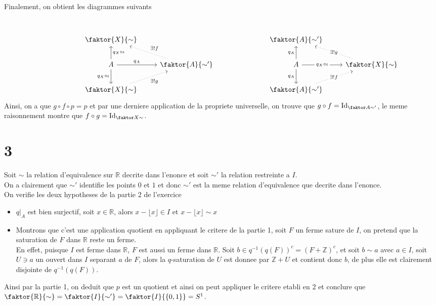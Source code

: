 \documentclass[11pt, a4paper]{article}
\DeclareMathOperator{\id}{Id}
\begin{document}
Finalement, on obtient les diagrammes suivants
\[\begin{tikzcd}
	{} \\
	&& {\faktor {X} {\sim}} &&&& {\faktor {A} {\sim'}} \\
	&& A & { \faktor {A} {\sim'}} &&& A & {\faktor {X} {\sim}} \\
	&& {\faktor {X} {\sim}} &&&& {\faktor {A} {\sim'}}
	\arrow["{q_X\circ\iota}"', from=3-3, to=4-3]
	\arrow["{q_A}", from=3-3, to=3-4]
	\arrow["{\exists ! g}"', dotted, from=4-3, to=3-4]
	\arrow["{q_X\circ\iota}"', from=3-3, to=2-3]
	\arrow["{\exists ! f}"', dotted, from=3-4, to=2-3]
	\arrow["{q_A}"', from=3-7, to=4-7]
	\arrow["{q_A}", from=3-7, to=2-7]
	\arrow["{q_X\circ \iota}"{description}, from=3-7, to=3-8]
	\arrow["{\exists ! f}"{description}, dotted, from=4-7, to=3-8]
	\arrow["{\exists ! g}"{description}, dotted, from=3-8, to=2-7]
\end{tikzcd}\]
Ainsi, on a que $g\circ f \circ p = p$ et par une derniere application de la propriete universelle, on trouve que $g\circ f = \id_{ \faktor A { \sim '} } $, le meme raisonnement montre que $f\circ g = \id_{ \faktor X \sim} $.

\section*{3}
Soit $\sim $ la relation d'equivalence sur $ \mathbb{R}$ decrite dans l'enonce et soit $\sim '$ la relation restreinte a $I$.\\
On a clairement que $\sim '$ identifie les points $0$ et $1$ et donc $\sim '$ est la meme relation d'equivalence que decrite dans l'enonce.\\
On verifie les deux hypotheses de la partie 2 de l'exercice
\begin{itemize}
\item $q\vert_A$ est bien surjectif, soit $x\in \mathbb{R}$, alors $x- \lfloor x\rfloor\in I$ et $ x- \lfloor x \rfloor \sim x$ 
\item Montrons que c'est une application quotient en appliquant le critere de la partie 1, soit $ F$ un ferme sature de $I$, on pretend que la saturation de $F$ dans $ \mathbb{R}$ reste un ferme.\\
	En effet, puisque $I$ est ferme dans $ \mathbb{R}$, $F$ est aussi un ferme dans $ \mathbb{R}$.
	Soit $ b\in q^{-1}( q( F) ) ^{c} = ( F + \mathbb{Z})^{c}$, et soit $ b \sim a$ avec $a \in I$, soit $U\ni a$ un ouvert dans $I$ separant $ a$ de $F$, alors la $q$-saturation de $ U$ est donnee par $ \mathbb{Z}+ U$ et contient donc $b$, de plus elle est clairement disjointe de $ q^{-1}( q( F) ) $.
\end{itemize}
Ainsi par la partie 1, on deduit que $ p$ est un quotient et ainsi on peut appliquer le critere etabli en 2 et conclure que $\faktor  { \mathbb{R} } { \sim} = \faktor { I} { \sim '} = \faktor { I} { \left\{ 0,1 \right\}  } = S^{1}$. 
\end{document}
